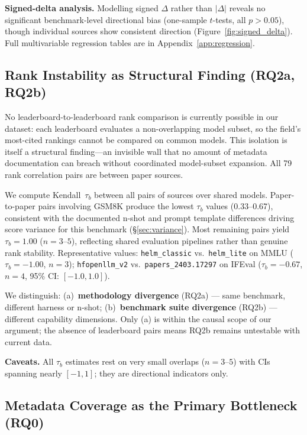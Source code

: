 \documentclass[11pt]{article}
\begin{document}
\textbf{Signed-delta analysis.}
Modelling signed $\Delta$ rather than $|\Delta|$ reveals no significant
benchmark-level directional bias (one-sample $t$-tests, all
$p > 0.05$), though individual sources show consistent direction
(Figure~\ref{fig:signed_delta}).
Full multivariable regression tables are in Appendix~\ref{app:regression}.

\subsection{Rank Instability as Structural Finding (RQ2a, RQ2b)}
\label{sec:ranks}

No leaderboard-to-leaderboard rank comparison is currently possible
in our dataset: each leaderboard evaluates a non-overlapping model
subset, so the field's most-cited rankings cannot be compared on
common models.
This isolation is itself a structural finding---an invisible wall
that no amount of metadata documentation can breach without
coordinated model-subset expansion.
All 79 rank correlation pairs are between paper sources.

We compute Kendall~$\tau_b$ between all pairs of sources over shared
models.
Paper-to-paper pairs involving GSM8K produce the lowest $\tau_b$
values (0.33--0.67), consistent with the documented n-shot and
prompt template differences driving score variance for this benchmark
(\S\ref{sec:variance}).
Most remaining pairs yield $\tau_b = 1.00$ ($n = 3$--$5$), reflecting
shared evaluation pipelines rather than genuine rank stability.
Representative values: \texttt{helm\_classic} vs.\ \texttt{helm\_lite} on MMLU
($\tau_b = -1.00$, $n = 3$); \texttt{hfopenllm\_v2} vs.\ \texttt{papers\_2403.17297}
on IFEval ($\tau_b = -0.67$, $n = 4$, 95\% CI: $[-1.0, 1.0]$).

We distinguish: (a)~\textbf{methodology divergence} (RQ2a) --- same
benchmark, different harness or n-shot; (b)~\textbf{benchmark suite
divergence} (RQ2b) --- different capability dimensions. Only (a) is
within the causal scope of our argument; the absence of leaderboard
pairs means RQ2b remains untestable with current data.

\textbf{Caveats.}
All $\tau_b$ estimates rest on very small overlaps ($n = 3$--$5$) with
CIs spanning nearly $[-1, 1]$; they are directional indicators only.

\subsection{Metadata Coverage as the Primary Bottleneck (RQ0)}
\label{sec:coverage}
\end{document}
